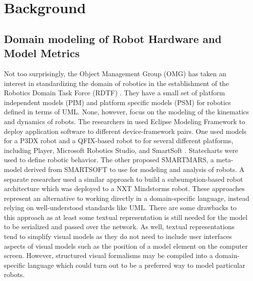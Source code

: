
\section{Background}\label{sec:rw}

\subsection{Domain modeling of Robot Hardware and Model Metrics}

Not too surprisingly, the Object Management Group (OMG) has taken an interest in standardizing the domain of robotics in the establishment of the Robotics Domain Task Force (RDTF) \cite{omg}. They have a small set of platform independent models (PIM) and platform specific models (PSM) \cite{rtc08,sdo08,rls10} for robotics defined in terms of UML. None, however, focus on the modeling of the kinematics and dynamics of robots. The researchers in \cite{schlegel09,Steck2010} used Eclipse Modeling Framework to deploy application software to different device-framework pairs. One \cite{schlegel09} used models for a P3DX robot and a QFIX-based robot to for several different platforms, including Player, Microsoft Robotics Studio, and SmartSoft \cite{smartsoft}. Statecharts \cite{Harel1988} were used to define robotic behavior. The other \cite{Steck2010} proposed SMARTMARS, a meta-model derived from SMARTSOFT to use for modeling and analysis of robots. A separate researcher \cite{Trojanek2011} used a similar approach to build a subsumption-based robot architecture which was deployed to a NXT Mindstorms robot. These approaches represent an alternative to working directly in a domain-specific language, instead relying on well-understood standards like UML. There are some drawbacks to this approach as at least some textual representation is still needed for the model to be serialized and passed over the network. As well, textual representations tend to simplify visual models as they do not need to include user interfaces aspects of visual models such as the position of a model element on the computer screen. However, structured visual formalisms may be compiled into a domain-specific language which could turn out to be a preferred way to model particular robots.

